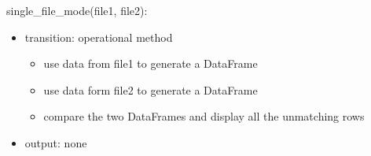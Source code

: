 \documentclass[12pt]{article}
\begin{document}





\noindent single\_file\_mode(file1, file2):
\begin{itemize}
  \item transition: operational method 
  \begin{itemize}[\null]
    \item use data from file1 to generate a DataFrame
    \item use data form file2 to generate a DataFrame
    \item compare the two DataFrames and display all the unmatching rows
  \end{itemize}
  \item output: none
\end{itemize}
\end{document}
